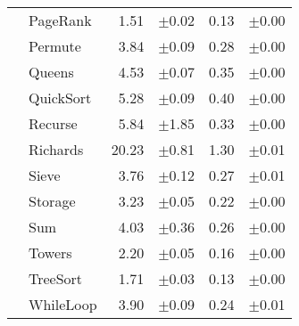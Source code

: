 \begin{tabular}{llrlrl}
 & PageRank & 1.51 & \scriptsize\textcolor{gray!60}{$\pm$0.02} & 0.13 & \scriptsize\textcolor{gray!60}{$\pm$0.00} \\
 & Permute & 3.84 & \scriptsize\textcolor{gray!60}{$\pm$0.09} & 0.28 & \scriptsize\textcolor{gray!60}{$\pm$0.00} \\
 & Queens & 4.53 & \scriptsize\textcolor{gray!60}{$\pm$0.07} & 0.35 & \scriptsize\textcolor{gray!60}{$\pm$0.00} \\
 & QuickSort & 5.28 & \scriptsize\textcolor{gray!60}{$\pm$0.09} & 0.40 & \scriptsize\textcolor{gray!60}{$\pm$0.00} \\
 & Recurse & 5.84 & \scriptsize\textcolor{gray!60}{$\pm$1.85} & 0.33 & \scriptsize\textcolor{gray!60}{$\pm$0.00} \\
 & Richards & 20.23 & \scriptsize\textcolor{gray!60}{$\pm$0.81} & 1.30 & \scriptsize\textcolor{gray!60}{$\pm$0.01} \\
 & Sieve & 3.76 & \scriptsize\textcolor{gray!60}{$\pm$0.12} & 0.27 & \scriptsize\textcolor{gray!60}{$\pm$0.01} \\
 & Storage & 3.23 & \scriptsize\textcolor{gray!60}{$\pm$0.05} & 0.22 & \scriptsize\textcolor{gray!60}{$\pm$0.00} \\
 & Sum & 4.03 & \scriptsize\textcolor{gray!60}{$\pm$0.36} & 0.26 & \scriptsize\textcolor{gray!60}{$\pm$0.00} \\
 & Towers & 2.20 & \scriptsize\textcolor{gray!60}{$\pm$0.05} & 0.16 & \scriptsize\textcolor{gray!60}{$\pm$0.00} \\
 & TreeSort & 1.71 & \scriptsize\textcolor{gray!60}{$\pm$0.03} & 0.13 & \scriptsize\textcolor{gray!60}{$\pm$0.00} \\
 & WhileLoop & 3.90 & \scriptsize\textcolor{gray!60}{$\pm$0.09} & 0.24 & \scriptsize\textcolor{gray!60}{$\pm$0.01} \\
\bottomrule
\end{tabular}
